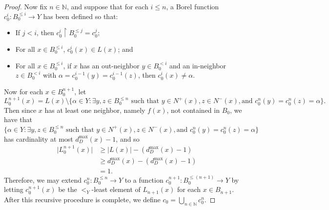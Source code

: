 \documentclass[psamsfonts]{amsart}
\theoremstyle{definition}
\newcommand{\N}{\mathbb N}
\theoremstyle{remark}
\numberwithin{equation}{section}
\begin{document}
\begin{proof}
    Now fix $n \in \N$, and suppose that for each $i \leq n$, a Borel function $c_0^i : B_0^{\leq i} \to Y$ has been defined so that:
    \begin{itemize}
        \item If $j < i$, then $c_0^i \restriction B_0^{\leq j} = c_0^j$;
        \item For all $x \in B_0^{\leq i}$, $c_0^i(x) \in L(x)$; and
        \item For all $x \in B_0^{\leq i}$, if $x$ has an out-neighbor $y \in B_0^{< i}$ and an in-neighbor $z \in B_0^{< i}$ with $\alpha = c_0^{i - 1}(y) = c_0^{i - 1}(z)$, then $c_0^i(x) \neq \alpha$.
    \end{itemize}
    Now for each $x \in B_0^{n + 1}$, let
    $$L_0^{n + 1}(x) = L(x) \setminus \{\alpha \in Y : \exists y, z \in B_0^{\leq n} \text{ such that } y \in N^+(x), z \in N^-(x), \text{and } c_0^n(y) = c_0^n(z) = \alpha \}.$$
    Then since $x$ has at least one neighbor, namely $f(x)$, not contained in $B_0$, we have that $\{\alpha \in Y : \exists y, z \in B_0^{\leq n} \text{ such that } y \in N^+(x), z \in N^-(x), \text{and } c_0^n(y) = c_0^n(z) = \alpha \}$ has cardinality at most $d^{\max}_D(x) - 1$, and so
    \begin{align*}
        \vert L_0^{n + 1}(x) \vert & \geq \vert L(x) \vert - (d^{\max}_D(x) - 1) \\
        & \geq d^{\max}_D(x) - (d^{\max}_D(x) - 1) \\
        & = 1.
    \end{align*}
    Therefore, we may extend $c_0^n : B_0^{\leq n} \to Y$ to a function $c_0^{n + 1} : B_0^{\leq (n + 1)} \to Y$ by letting $c_0^{n + 1}(x)$ be the $<_Y$-least element of $L_{n + 1}(x)$ for each $x \in B_{n + 1}$. After this recursive procedure is complete, we define $c_0 = \bigcup_{n \in \N} c_0^n$.


\end{proof}
\end{document}

